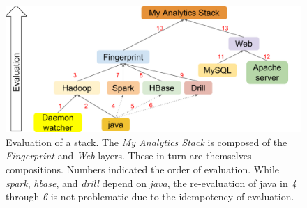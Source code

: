 \begin{figure}
\centering
\includegraphics[width=1\columnwidth]{images/cloudmesh-stack-graph.pdf}
\caption{Evaluation of a stack.
  The \emph{My Analytics Stack} is composed of the \emph{Fingerprint} and \emph{Web} layers.
  These in turn are themselves compositions.
  Numbers indicated the order of evaluation.
  While \emph{spark}, \emph{hbase}, and \emph{drill} depend on \emph{java}, 
  the re-evaluation of java in \textit{4} through \textit{6}
  is not problematic due to the idempotency of evaluation.
  \label{F:stack-graph}}
\end{figure}

